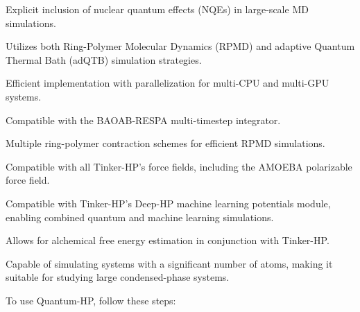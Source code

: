 \begin{DoxyItemize}
\item Explicit inclusion of nuclear quantum effects (N\-Q\-Es) in large-\/scale M\-D simulations.
\item Utilizes both Ring-\/\-Polymer Molecular Dynamics (R\-P\-M\-D) and adaptive Quantum Thermal Bath (ad\-Q\-T\-B) simulation strategies.
\item Efficient implementation with parallelization for multi-\/\-C\-P\-U and multi-\/\-G\-P\-U systems.
\item Compatible with the B\-A\-O\-A\-B-\/\-R\-E\-S\-P\-A multi-\/timestep integrator.
\item Multiple ring-\/polymer contraction schemes for efficient R\-P\-M\-D simulations.
\item Compatible with all Tinker-\/\-H\-P's force fields, including the A\-M\-O\-E\-B\-A polarizable force field.
\item Compatible with Tinker-\/\-H\-P's Deep-\/\-H\-P machine learning potentials module, enabling combined quantum and machine learning simulations.
\item Allows for alchemical free energy estimation in conjunction with Tinker-\/\-H\-P.
\item Capable of simulating systems with a significant number of atoms, making it suitable for studying large condensed-\/phase systems. 


\end{DoxyItemize}

To use Quantum-\/\-H\-P, follow these steps\-:


